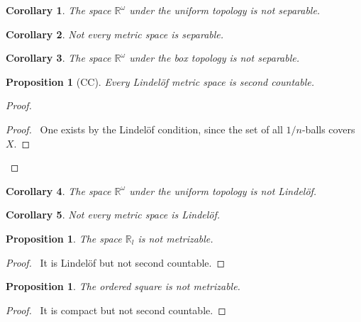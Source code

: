 \documentclass{report}
\let\qed\relax
\newtheorem{prop}[lm]{Proposition}
\newtheorem{cor}{Corollary}[lm]
\theoremstyle{definition}
\begin{document}
  \begin{cor}
    The space $\mathbb{R}^\omega$ under the uniform topology is not separable.
  \end{cor}

  \begin{cor}
    Not every metric space is separable.
  \end{cor}

\begin{cor}
	The space $\mathbb{R}^\omega$ under the box topology is not separable.
\end{cor}
    \begin{prop}[CC]
      \label{prop:topology:metric:Lindelof_second_countable}
    Every Lindel\"{o}f metric space is second countable.
  \end{prop}

  \begin{proof}
   \pf
   \begin{proof}
     \pf\ One exists by the Lindel\"{o}f condition, since the set of all
$1/n$-balls covers $X$.
   \end{proof}
    \qed
  \end{proof}

  \begin{cor}
    The space $\mathbb{R}^\omega$ under the uniform topology is not
Lindel\"{o}f.
  \end{cor}

\begin{cor}
  Not every metric space is Lindel\"{o}f.
\end{cor}

  \begin{prop}
    The space $\mathbb{R}_l$ is not metrizable.
  \end{prop}

  \begin{proof}
    \pf\ It is Lindel\"{o}f but not second countable. \qed
  \end{proof}

    \begin{prop}
   The ordered square is not metrizable.
  \end{prop}

  \begin{proof}
   \pf\ It is compact but not second countable. \qed
  \end{proof}
\end{document}
